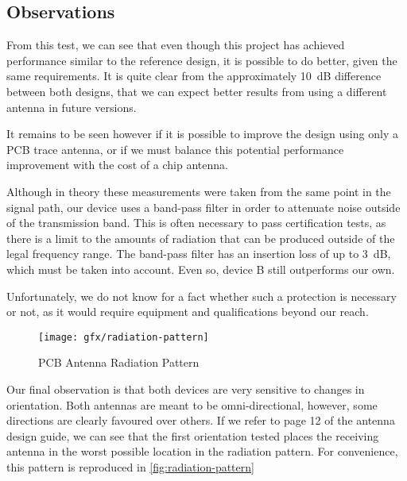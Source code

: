 \subsection{Observations}

From this test, we can see that even though this project has achieved
performance similar to the reference design, it is possible to do better, given
the same requirements. It is quite clear from the approximately \SI{10}{dB}
difference between both designs, that we can expect better results from using
a different antenna in future versions.

It remains to be seen however if it is possible to improve the design using only
a PCB trace antenna, or if we must balance this potential performance
improvement with the cost of a chip antenna.

Although in theory these measurements were taken from the same point in the
signal path, our device uses a band-pass filter in order to attenuate noise
outside of the transmission band. This is often necessary to pass certification
tests, as there is a limit to the amounts of radiation that can be produced
outside of the legal frequency range. The band-pass filter has an insertion loss
of up to \SI{3}{dB}, which must be taken into account. Even so, device B still
outperforms our own.

Unfortunately, we do not know for a fact whether such a protection is necessary
or not, as it would require equipment and qualifications beyond our reach. 

\begin{figure}[htb]
  \begin{center}
    \texttt{[image: gfx/radiation-pattern]}
  \end{center}
  \caption{PCB Antenna Radiation Pattern\citep{AN3359}}
  \label{fig:radiation-pattern}
\end{figure}

Our final observation is that both devices are very sensitive to changes in
orientation. Both antennas are meant to be omni-directional, however, some
directions are clearly favoured over others. If we refer to page 12 of the
antenna design guide\citep{AN3359}, we can see that the first orientation tested
places the receiving antenna in the worst possible location in the radiation
pattern. For convenience, this pattern is reproduced in
\autoref{fig:radiation-pattern}

